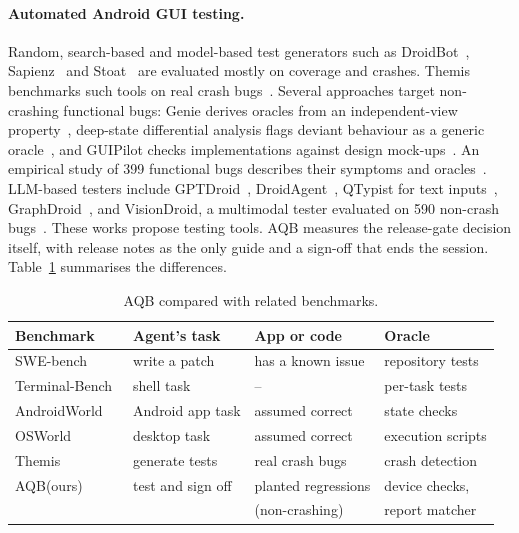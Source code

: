 \documentclass[sigconf]{acmart}
\newcommand{\aqb}{AQB\xspace}
\begin{document}
\paragraph{Automated Android GUI testing.}
Random, search-based and model-based test generators such as DroidBot~\cite{li2017droidbot},
Sapienz~\cite{mao2016sapienz} and Stoat~\cite{su2017stoat} are evaluated mostly on coverage and
crashes. Themis benchmarks such tools on real crash bugs~\cite{su2021themis}. Several approaches
target non-crashing functional bugs: Genie derives oracles from an independent-view
property~\cite{su2021genie}, deep-state differential analysis flags deviant behaviour as a generic
oracle~\cite{wang2022deepstate}, and GUIPilot checks implementations against design
mock-ups~\cite{liu2025guipilot}. An empirical study of 399 functional bugs describes their symptoms
and oracles~\cite{xiong2023functionalbugs}. LLM-based testers include
GPTDroid~\cite{liu2024gptdroid}, DroidAgent~\cite{yoon2024droidagent}, QTypist for text
inputs~\cite{liu2023qtypist}, GraphDroid~\cite{li2026graphdroid}, and VisionDroid, a multimodal
tester evaluated on 590 non-crash bugs~\cite{liu2025visiondroid}. These works propose testing tools.
\aqb measures the release-gate decision itself, with release notes as the only guide and a sign-off
that ends the session. Table~\ref{tab:related} summarises the differences.

\begin{table}[t]
  \caption{\aqb compared with related benchmarks.}
  \label{tab:related}
  \footnotesize\setlength{\tabcolsep}{2.5pt}
  \begin{tabular}{@{}llll@{}}
    \toprule
    Benchmark & Agent's task & App or code & Oracle \\
    \midrule
    SWE-bench~\cite{jimenez2024swebench} & write a patch & has a known issue & repository tests \\
    Terminal-Bench~\cite{merrill2026terminalbench} & shell task & -- & per-task tests \\
    AndroidWorld~\cite{rawles2025androidworld} & Android app task & assumed correct & state checks \\
    OSWorld~\cite{xie2024osworld} & desktop task & assumed correct & execution scripts \\
    Themis~\cite{su2021themis} & generate tests & real crash bugs & crash detection \\
    \aqb (ours) & test and sign off & planted regressions & device checks, \\
     & & (non-crashing) & report matcher \\
    \bottomrule
  \end{tabular}
\end{table}
\end{document}
